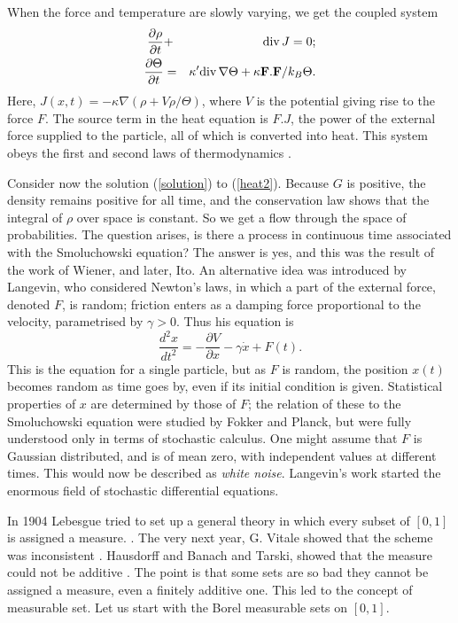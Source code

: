 When the force and
temperature are slowly varying, we get the coupled system
\begin{eqnarray}
\frac{\partial \rho}{\partial t}&+&\mbox{div}\,J=0;\\
\frac{\partial\Theta}{\partial t}&=&\kappa^\prime \mbox{div}\,\nabla\Theta+\kappa
{\bf F}.{\bf F}/k_B\Theta.
\end{eqnarray}
Here, $J(x,t)=-\kappa\nabla(\rho+V\rho/\Theta)$, where $V$ is the potential
giving rise to the force $F$. The source term in the heat equation is $F.J$,
the power of the external force supplied to the particle, all of which is
converted into heat. This system obeys
the first and second laws of thermodynamics \cite{RFS1}.

Consider now the solution (\ref{solution}) to (\ref{heat2}). Because $G$ is positive,
the density remains positive for all time, and the conservation law shows
that the integral of $\rho$ over space is constant. So we get a flow
through the space of probabilities. The question arises, is there a
process in continuous time associated with the Smoluchowski equation?
The answer is yes, and this was the result of the work of Wiener,
and later, Ito. An alternative idea was introduced by Langevin, who
considered Newton's laws, in which a part of the external
force, denoted $F$, is random; friction enters as a damping
force proportional to the velocity, parametrised by $\gamma>0$.
Thus his equation is
\begin{equation}
\frac{d^2x}{dt^2}=-\frac{\partial V}{\partial x}-\gamma\dot{x}+F(t).
\label{Langevin}
\end{equation}
This is the equation for a single particle, but as $F$ is random, the
position
$x(t)$ becomes random as time goes by, even if its initial condition is
given. Statistical properties of $x$ are determined by those of $F$; the
relation of these to the Smoluchowski equation were studied by Fokker and
Planck, but were fully understood only in terms of stochastic calculus.
One might assume that $F$ is Gaussian distributed, and is of mean zero,
with independent values at different times. This would now be described as
{\em white noise}. Langevin's work started the enormous field of
stochastic differential equations.



In 1904 Lebesgue tried to set up a general theory in which every subset
of $[0,1]$ is assigned a measure.
\cite{Legesgue}. 
The very next year, G. Vitale showed that the scheme was inconsistent
\cite{Vitale}. Hausdorff \cite{Hausdorff} and Banach and Tarski,
showed that the measure could not be additive \cite{Williams}. The point
is that some
sets are so bad they cannot be assigned a measure, even a finitely
additive one. This led to the concept of measurable set. Let us start with
the Borel measurable sets on $[0,1]$.

